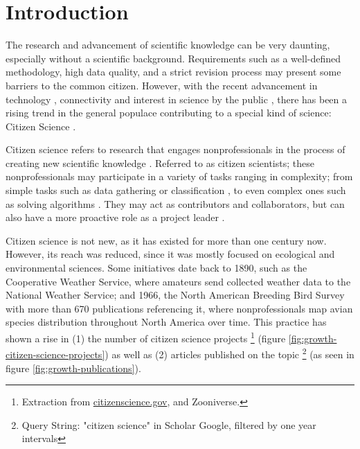 \chapter*[Introduction]{Introduction}

The research and advancement of scientific knowledge can be very daunting, especially without a scientific background. Requirements such as a well-defined methodology, high data quality, and a strict revision process may present some barriers to the common citizen. However, with the recent advancement in technology \cite{newman2012future}, connectivity \cite{newman2012future} and interest in science by the public \cite{silvertown2009new}, there has been a rising trend in the general populace contributing to a special kind of science: Citizen Science \cite{mckinley2017citizen}.

Citizen science refers to research that engages nonprofessionals in the process of creating new scientific knowledge \cite{bonney2014next}. Referred to as citizen scientists; these nonprofessionals may participate in a variety of tasks ranging in complexity; from simple tasks such as data gathering or classification \cite{barker2013pascal}, to even complex ones such as solving algorithms \cite{cooper2010predicting}. They may act as contributors and collaborators, but can also have a more proactive role as a project leader \cite{robinson2018ten}.

Citizen science is not new, as it has existed for more than one century now. However, its reach was reduced, since it was mostly focused on ecological and environmental sciences. Some initiatives date back to 1890, such as the Cooperative Weather Service, where amateurs send collected weather data to the National Weather Service; and 1966, the North American Breeding Bird Survey with more than 670 publications referencing it, where nonprofessionals map avian species distribution throughout North America over time. This practice has shown a rise in (1) the number of citizen science projects \footnote{Extraction from \href{citizenscience.gov}{citizenscience.gov}, and Zooniverse.} (figure \ref{fig:growth-citizen-science-projects}) as well as (2) articles published on the topic \footnote{Query String: "citizen science" in Scholar Google, filtered by one year intervals} (as seen in figure \ref{fig:growth-publications}).

\publicationdata

